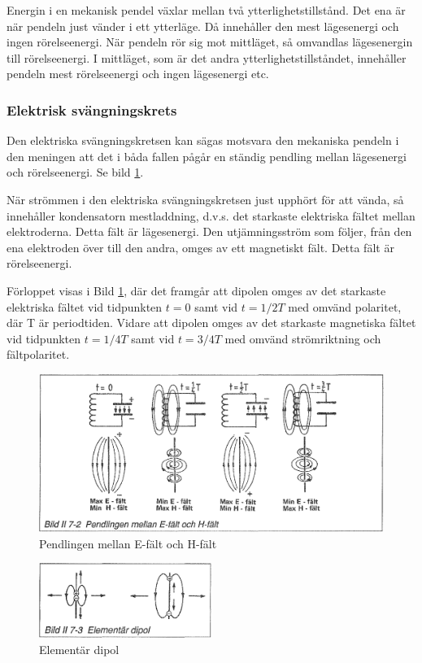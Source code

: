 Energin i en mekanisk pendel växlar mellan två
ytterlighetstillstånd. Det ena är när pendeln just vänder i ett
ytterläge. Då innehåller den mest lägesenergi och ingen
rörelseenergi. När pendeln rör sig mot mittläget, så omvandlas
lägesenergin till rörelseenergi. I mittläget, som är det andra
ytterlighetstillståndet, innehåller pendeln mest rörelseenergi och
ingen lägesenergi etc.

\subsubsection{Elektrisk svängningskrets}

Den elektriska svängningskretsen kan sägas motsvara den mekaniska
pendeln i den meningen att det i båda fallen pågår en ständig pendling
mellan lägesenergi och rörelseenergi. Se bild \ref{fig:BildII7-02}.

När strömmen i den elektriska svängningskretsen just upphört för att
vända, så innehåller kondensatorn mestladdning, d.v.s. det starkaste
elektriska fältet mellan elektroderna. Detta fält är lägesenergi. Den
utjämningsström som följer, från den ena elektroden över till den
andra, omges av ett magnetiskt fält. Detta fält är rörelseenergi.

Förloppet visas i Bild \ref{fig:BildII7-02}, där det framgår att dipolen omges av
det starkaste elektriska fältet vid tidpunkten \(t=0\) samt vid
\(t=1/2T\) med omvänd polaritet, där T är periodtiden. Vidare att
dipolen omges av det starkaste magnetiska fältet vid tidpunkten
\(t=1/4T\) samt vid \(t=3/4T\) med omvänd strömriktning och
fältpolaritet.

\begin{figure}
\includegraphics[width=\textwidth]{images/bild_2_7-02}
\caption{Pendlingen mellan E-fält och H-fält}
\label{fig:BildII7-02}
\end{figure}

\begin{figure}
\includegraphics[width=0.5\textwidth]{images/bild_2_7-03}
\caption{Elementär dipol}
\label{fig:BildII7-03}
\end{figure}

